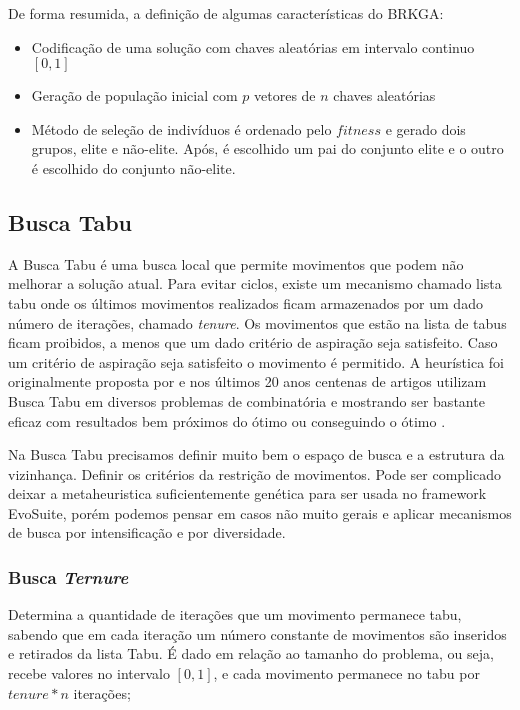 \documentclass[12pt,a4paper]{article}
\begin{document}
De forma resumida, a definição de algumas características do BRKGA: 


\begin{itemize}
\item Codificação de uma solução com chaves aleatórias em intervalo continuo $[0,1]$ 
\item Geração de população inicial com $p$ vetores de $n$ chaves aleatórias
\item Método de seleção de indivíduos é ordenado pelo $fitness$ e gerado dois grupos, elite e não-elite. Após, é escolhido um pai do conjunto elite e o outro é escolhido do conjunto não-elite. 
\end{itemize}

\subsection{Busca Tabu}
A Busca Tabu é uma busca local que permite movimentos que podem não melhorar a solução atual. Para evitar ciclos, existe um mecanismo chamado lista tabu onde os últimos movimentos realizados
ficam armazenados por um dado número de iterações, chamado \textit{tenure}. Os movimentos que estão na lista de tabus ficam proibidos, a menos que um dado critério de aspiração seja
satisfeito. Caso um critério de aspiração seja satisfeito o movimento é permitido. A heurística foi originalmente proposta por \citeauthor{glover1986future} \cite{glover1986future} e nos
últimos 20 anos centenas de artigos utilizam Busca Tabu em diversos problemas de combinatória e mostrando ser bastante eficaz com resultados bem próximos do ótimo ou conseguindo o ótimo
\cite{gendreau2010handbook}.

Na Busca Tabu precisamos definir muito bem o espaço de busca e a estrutura da vizinhança. Definir os critérios da restrição de movimentos. Pode ser complicado deixar a metaheuristica
suficientemente genética para ser usada no framework EvoSuite, porém podemos pensar em casos não muito gerais e aplicar mecanismos de busca por intensificação e por diversidade.

    \subsubsection{Busca \textit{Ternure}}

        Determina a quantidade de iterações que um movimento permanece tabu, sabendo que em cada iteração um número constante de movimentos são inseridos e retirados da lista
        Tabu. É dado em relação ao tamanho do problema, ou seja, recebe valores no intervalo $[0,1]$, e cada movimento permanece no tabu por $\textit{tenure}*n$ iterações;
\end{document}
